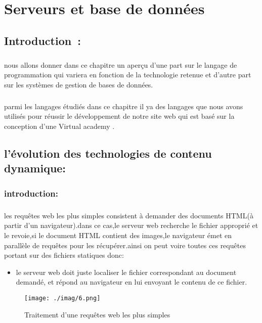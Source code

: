 \chapter{Serveurs et base de données}

\minitoc
\section{Introduction :}
\paragraph{} 
nous allons donner dans ce chapitre un aperçu d'une part sur le langage de programmation qui variera en fonction de la technologie retenue et d'autre part sur les systèmes de gestion de bases de données.
\paragraph{}
parmi les langages étudiés dans ce chapitre il ya des langages que nous avons utilisés pour réussir le développement de notre site web qui est basé sur la conception d'une Virtual academy .
\section{l'évolution des technologies de contenu dynamique:}
\subsection{introduction:}
\paragraph{}
les requêtes web les plus simples consistent à demander des documents HTML(à partir d'un navigateur).dans ce cas,le serveur web recherche le fichier approprié et le revoie,si le document HTML contient des images,le navigateur émet en parallèle de requêtes pour les récupérer.ainsi on peut voire toutes ces requêtes portant sur des fichiers statiques donc:
\begin{itemize}
	\item le serveur web doit juste localiser le fichier correspondant au document demandé, et répond au navigateur en lui envoyant le contenu de ce fichier.
\end{itemize} 

\begin{figure}[h]
	\centering
	\texttt{[image: ./imag/6.png]}
	\caption{Traitement d'une requêtes web les plus simples}
\end{figure}
